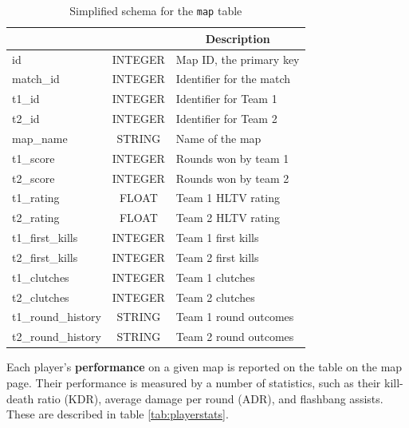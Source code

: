 \begin{table}[h]
	\centering
	\caption{Simplified schema for the \texttt{map} table}
	\renewcommand{\arraystretch}{1.2} %
	\begin{tabular}{|>{\ttfamily}l|>{\ttfamily}c|l|}
		\hline
		\multicolumn{1}{|c|}{\textnormal{\textbf{Field}}} & \multicolumn{1}{c|}{\textnormal{\textbf{Type}}} & \multicolumn{1}{c|}{\textbf{Description}} \\
		\hline
		id & INTEGER & Map ID, the primary key \\
		\hline
		match\_id & INTEGER & Identifier for the match \\
		\hline
		t1\_id & INTEGER & Identifier for Team 1 \\
		\hline
		t2\_id & INTEGER & Identifier for Team 2 \\
		\hline
		map\_name & STRING & Name of the map \\
		\hline
		t1\_score & INTEGER & Rounds won by team 1\\
		\hline
		t2\_score & INTEGER & Rounds won by team 2\\
		\hline
		t1\_rating & FLOAT & Team 1 HLTV rating \\
		\hline
		t2\_rating & FLOAT & Team 2 HLTV rating \\
		\hline
		t1\_first\_kills & INTEGER & Team 1 first kills \\
		\hline
		t2\_first\_kills & INTEGER & Team 2 first kills \\
		\hline
		t1\_clutches & INTEGER & Team 1 clutches\footnotemark[2] \\
		\hline
		t2\_clutches & INTEGER & Team 2 clutches\footnotemark[2] \\
		\hline
		t1\_round\_history & STRING & Team 1 round outcomes \\
		\hline
		t2\_round\_history & STRING & Team 2 round outcomes \\
		\hline
	\end{tabular}
	\label{tab:map}
\end{table}



Each player's \textbf{performance} on a given map is reported on the table on the map page. Their performance is measured by a number of statistics, such as their kill-death ratio (KDR), average damage per round (ADR), and flashbang assists. These are described in table \ref{tab:playerstats}.

